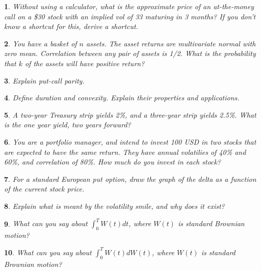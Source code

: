 \documentclass{report}
\newtheorem{problem}{}
\numberwithin{problem}{chapter} %
\begin{document}
\begin{problem}
Without using a calculator, what is the approximate price of an at-the-money call on a \$30 stock with an implied vol of 33 maturing in 3 months? If you don't know a shortcut for this, derive a shortcut.
\end{problem}

\begin{problem}
You have a basket of $n$ assets. The asset returns are multivariate normal with zero mean. Correlation between any pair of assets is 1/2. What is the probability that $k$ of the assets will have positive return?
\end{problem}

\begin{problem}
Explain put-call parity.
\end{problem}

\begin{problem}
Define duration and convexity. Explain their properties and applications.
\end{problem}

\begin{problem}
A two-year Treasury strip yields 2\%, and a three-year strip yields 2.5\%. What is the one year yield, two years forward? 
\end{problem}

\begin{problem}
\cite{CRACK} You are a portfolio manager, and intend to invest 100 USD in two stocks that are expected to have the same return. They have annual volatilies of 40\% and 60\%, and correlation of 80\%.  How much do you invest in each stock?
\end{problem}

\begin{problem}
\cite{CRACK} For a standard European put option, draw the graph of the delta as a function of the current stock price.
\end{problem}

\begin{problem}
Explain what is meant by the volatility smile, and why does it exist?
\end{problem}

\begin{problem}
\cite{CRACK} What can you say about $\int_0^{T} W(t)dt$, where $W(t)$ is standard Brownian motion?
\end{problem}

\begin{problem}
\cite{CRACK} What can you say about $\int_0^{T} W(t)dW(t)$, where $W(t)$ is standard Brownian motion?
\end{problem}
\end{document}
